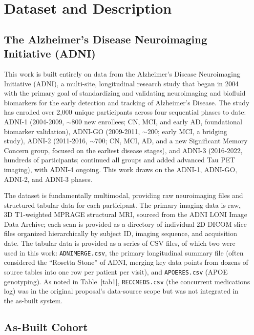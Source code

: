 \documentclass[pdflatex,sn-mathphys-num]{sn-jnl}%
\theoremstyle{thmstyleone}%
\theoremstyle{thmstyletwo}%
\theoremstyle{thmstylethree}%
\begin{document}
\FloatBarrier
\section{Dataset and Description}\label{sec4}

\subsection{The Alzheimer's Disease Neuroimaging Initiative (ADNI)}\label{sec4_1}

This work is built entirely on data from the Alzheimer's Disease Neuroimaging Initiative (ADNI), a multi-site, longitudinal research study that began in 2004 with the primary goal of standardizing and validating neuroimaging and biofluid biomarkers for the early detection and tracking of Alzheimer's Disease. The study has enrolled over 2,000 unique participants across four sequential phases to date: ADNI-1 (2004-2009, $\sim$800 new enrollees; CN, MCI, and early AD, foundational biomarker validation), ADNI-GO (2009-2011, $\sim$200; early MCI, a bridging study), ADNI-2 (2011-2016, $\sim$700; CN, MCI, AD, and a new Significant Memory Concern group, focused on the earliest disease stages), and ADNI-3 (2016-2022, hundreds of participants; continued all groups and added advanced Tau PET imaging), with ADNI-4 ongoing. This work draws on the ADNI-1, ADNI-GO, ADNI-2, and ADNI-3 phases.

The dataset is fundamentally multimodal, providing raw neuroimaging files and structured tabular data for each participant. The primary imaging data is raw, 3D T1-weighted MPRAGE structural MRI, sourced from the ADNI LONI Image Data Archive; each scan is provided as a directory of individual 2D DICOM slice files organized hierarchically by subject ID, imaging sequence, and acquisition date. The tabular data is provided as a series of CSV files, of which two were used in this work: \texttt{ADNIMERGE.csv}, the primary longitudinal summary file (often considered the ``Rosetta Stone'' of ADNI, merging key data points from dozens of source tables into one row per patient per visit), and \texttt{APOERES.csv} (APOE genotyping). As noted in Table~\ref{tab1}, \texttt{RECCMEDS.csv} (the concurrent medications log) was in the original proposal's data-source scope but was not integrated in the as-built system.

\subsection{As-Built Cohort}\label{sec4_2}
\end{document}
